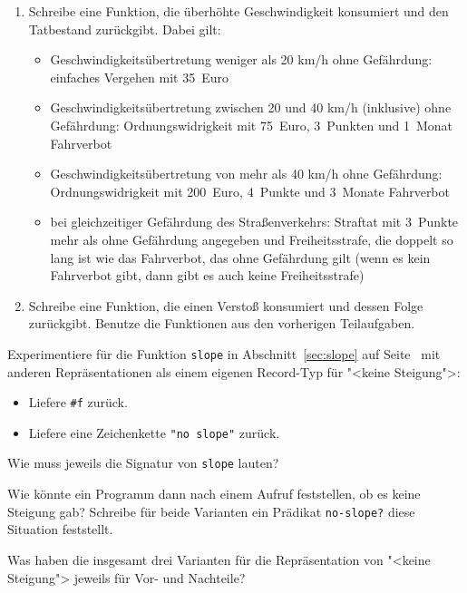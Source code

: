 \begin{aufgabe}
\begin{enumerate}
  \item Schreibe eine Funktion, die überhöhte
    Geschwindigkeit konsumiert und den Tatbestand zurückgibt.  Dabei
    gilt:
    \begin{itemize}
    \item Geschwindigkeitsübertretung weniger als 20 km/h ohne Gefährdung:
      einfaches Vergehen mit 35~Euro
    \item Geschwindigkeitsübertretung zwischen 20 und 40 km/h
      (inklusive) ohne Gefährdung: Ordnungswidrigkeit mit 75~Euro,
      3~Punkten und 1~Monat Fahrverbot
    \item Geschwindigkeitsübertretung von mehr als 40 km/h ohne
      Gefährdung: Ordnungswidrigkeit mit 200~Euro, 4~Punkte und
      3~Monate Fahrverbot
    \item bei gleichzeitiger Gefährdung des Straßenverkehrs: Straftat
      mit 3~Punkte mehr als ohne Gefährdung angegeben und
      Freiheitsstrafe, die doppelt so lang ist wie das Fahrverbot, das
      ohne Gefährdung gilt (wenn es kein Fahrverbot gibt, dann gibt es
      auch keine Freiheitsstrafe)
    \end{itemize}

  \item Schreibe eine Funktion, die einen
    Verstoß konsumiert und dessen Folge zurückgibt.  Benutze die
    Funktionen aus den vorherigen Teilaufgaben.
  \end{enumerate}
\end{aufgabe}

\begin{aufgabe}\label{aufgabe:no-slope}
  Experimentiere für die Funktion \lstinline{slope} in
  Abschnitt~\ref{sec:slope} auf Seite~\pageref{sec:slope}
  mit anderen Repräsentationen als einem eigenen
  Record-Typ für "<keine Steigung">:
  \begin{itemize}
  \item Liefere \lstinline{#f} zurück.
  \item Liefere eine Zeichenkette \lstinline{"no slope"} zurück.
  \end{itemize}
  Wie muss jeweils die Signatur von \lstinline{slope} lauten?
  
  Wie könnte ein Programm dann nach einem Aufruf feststellen, ob es
  keine Steigung gab?  Schreibe für beide Varianten ein Prädikat
  \lstinline{no-slope?} diese Situation feststellt.

  Was haben die insgesamt drei Varianten für die Repräsentation von
  "<keine Steigung"> jeweils für Vor- und Nachteile?
\end{aufgabe}

